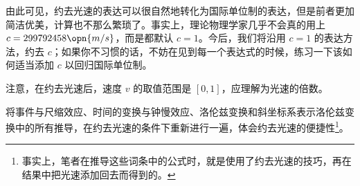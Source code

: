 由此可见，约去光速的表达可以很自然地转化为国际单位制的表达，但是前者更加简洁优美，计算也不那么繁琐了。事实上，理论物理学家几乎不会真的用上 $c=299792458\opn{m/s}$，而是都默认 $c=1$。今后，我们将沿用 $c=1$ 的表达方法，约去 $c$；如果你不习惯的话，不妨在见到每一个表达式的时候，练习一下该如何适当添加 $c$ 以回归国际单位制。

注意，在约去光速后，速度 $v$ 的取值范围是 $[0,1]$，应理解为光速的倍数。

\begin{exercise}{}
将事件与尺缩效应、时间的变换与钟慢效应、洛伦兹变换和斜坐标系表示洛伦兹变换中的所有推导，在约去光速的条件下重新进行一遍，体会约去光速的便捷性\footnote{事实上，笔者在推导这些词条中的公式时，就是使用了约去光速的技巧，再在结果中把光速添加回去而得到的。}。
\end{exercise}


